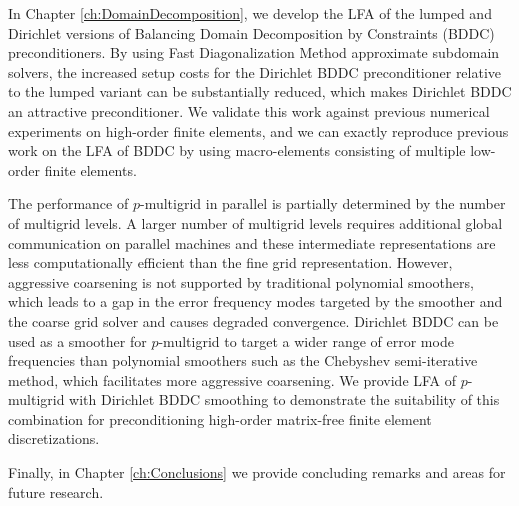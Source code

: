 In Chapter \ref{ch:DomainDecomposition}, we develop the LFA of the lumped and Dirichlet versions of Balancing Domain Decomposition by Constraints (BDDC) preconditioners.
By using Fast Diagonalization Method approximate subdomain solvers, the increased setup costs for the Dirichlet BDDC preconditioner relative to the lumped variant can be substantially reduced, which makes Dirichlet BDDC an attractive preconditioner.
We validate this work against previous numerical experiments on high-order finite elements, and we can exactly reproduce previous work on the LFA of BDDC by using macro-elements consisting of multiple low-order finite elements.

The performance of $p$-multigrid in parallel is partially determined by the number of multigrid levels.
A larger number of multigrid levels requires additional global communication on parallel machines and these intermediate representations are less computationally efficient than the fine grid representation.
However, aggressive coarsening is not supported by traditional polynomial smoothers, which leads to a gap in the error frequency modes targeted by the smoother and the coarse grid solver and causes degraded convergence.
Dirichlet BDDC can be used as a smoother for $p$-multigrid to target a wider range of error mode frequencies than polynomial smoothers such as the Chebyshev semi-iterative method, which facilitates more aggressive coarsening.
We provide LFA of $p$-multigrid with Dirichlet BDDC smoothing to demonstrate the suitability of this combination for preconditioning high-order matrix-free finite element discretizations.

Finally, in Chapter \ref{ch:Conclusions} we provide concluding remarks and areas for future research.